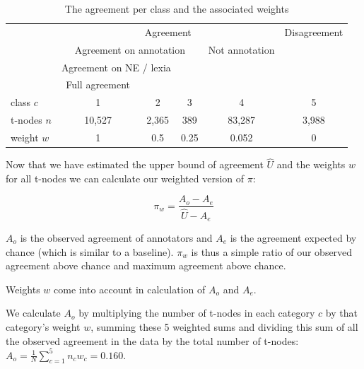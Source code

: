 \documentclass[11pt]{article}
\begin{document}
\begin{table}[H]
\begin{tiny}
\begin{center}
 \begin{tabular}{|l|c|c|c|c|c|}
\hline
&\multicolumn{4}{c|}{Agreement} & Disagreement\\
\cline{2-6}
&\multicolumn{3}{c|}{Agreement on annotation} & Not annotation &  \\
\cline{2-5}
&\multicolumn{2}{c|}{Agreement on NE / lexia} &&&\\
\cline{2-3}
&Full agreement &&&&\\
\cline{1-6}
class $c$& 1 & 2 & 3 & 4 & 5\\
\cline{1-6}
t-nodes $n$& 10,527 & 2,365 & 389 & 83,287 & 3,988\\
\cline{1-6}
weight $w$ & 1 & 0.5 & 0.25 & 0.052 & 0 \\
\hline
\end{tabular}
\end{center}
\caption{The agreement per class and the associated weights}
\end{tiny}
\label{tab-agreement}
\end{table}


Now that we have estimated the upper bound of agreement $\widehat{U}$ and the weights $w$ for all t-nodes we can calculate our weighted version of $\pi$:

$$\pi_w = \frac{A_o - A_e}{\widehat{U} - A_e}$$

$A_o$ is the observed agreement of annotators and $A_e$ is the agreement expected by chance (which is similar to a baseline). $\pi_w$ is thus a simple ratio of our observed agreement above chance and maximum a\-greement above chance.

Weights $w$ come into account in calculation of $A_o$ and $A_e$.

We calculate $A_o$ by multiplying the number of t-nodes in each category $c$ by that category's weight $w$, summing these 5 weighted sums and dividing this sum of all the observed agreement in the data by the total number of t-nodes:
$A_o = \frac{1}{N} \sum_{c =1}^{5} n_c w_c = 0.160$.
\end{document}
